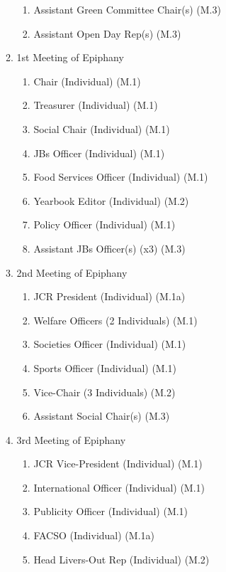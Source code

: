 \begin{enumerate}
\begin{enumerate}
\begin{enumerate}
            \item Assistant Green Committee Chair(s) (M.3)
            \item Assistant Open Day Rep(s) (M.3)
        \end{enumerate}
        \item 1st Meeting of Epiphany
        \begin{enumerate}
            \item Chair (Individual) (M.1)
            \item Treasurer (Individual) (M.1)
            \item Social Chair (Individual) (M.1)
            \item JBs Officer (Individual) (M.1)
            \item Food Services Officer (Individual) (M.1)
            \item Yearbook Editor (Individual) (M.2)
            \item Policy Officer (Individual) (M.1)
            \item Assistant JBs Officer(s) (x3) (M.3)
        \end{enumerate}
        \item 2nd Meeting of Epiphany
        \begin{enumerate}
            \item JCR President (Individual) (M.1a)
            \item Welfare Officers (2 Individuals)  (M.1)
            \item Societies Officer (Individual) (M.1)
            \item Sports Officer (Individual) (M.1)
            \item Vice-Chair (3 Individuals) (M.2)
            \item Assistant Social Chair(s) (M.3)
        \end{enumerate}
        \item 3rd Meeting of Epiphany
        \begin{enumerate}
            \item JCR Vice-President (Individual) (M.1)
            \item International Officer (Individual) (M.1)
            \item Publicity Officer (Individual) (M.1)
            \item FACSO (Individual) (M.1a)
            \item Head Livers-Out Rep (Individual) (M.2)
            

\end{enumerate}
\end{enumerate}
\end{enumerate}
